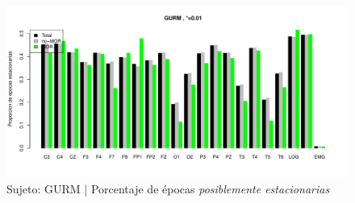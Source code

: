 \begin{figure}
\centering
\includegraphics[width=\linewidth]
{./material_bonito170220/porcentaje_bis/GH24031950SUENO_267_3281_1_bar_porcentaje.pdf} 
\caption{Sujeto: GURM | Porcentaje de \'epocas \textit{posiblemente estacionarias}}
\end{figure}


